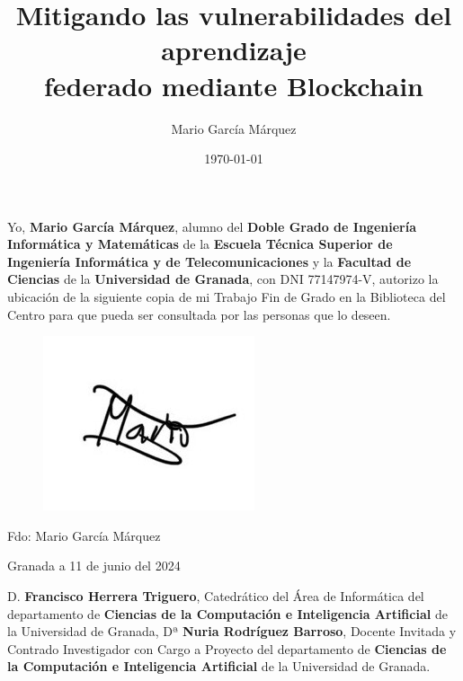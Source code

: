 \documentclass[oneside,openright,titlepage,numbers=noenddot,openany,headinclude,footinclude=true,
cleardoublepage=empty,abstractoff,BCOR=5mm,paper=a4,fontsize=12pt,main=spanish]{scrreprt}
\author{Mario García Márquez}
\date{\today}
\title{Mitigando las vulnerabilidades del aprendizaje\\federado mediante Blockchain}
\begin{document}
\maketitle



\tableofcontents

\thispagestyle{empty}

\newpage


Yo, \textbf{Mario García Márquez}, alumno del \textbf{Doble Grado de Ingeniería Informática y Matemáticas} de la \textbf{Escuela Técnica Superior de Ingeniería Informática y de Telecomunicaciones} y la \textbf{Facultad de Ciencias} de la \textbf{Universidad de Granada}, con DNI 77147974-V, autorizo la ubicación de la siguiente copia de mi Trabajo Fin de Grado en la Biblioteca del Centro para que pueda ser consultada por las personas que lo deseen.



\vspace{25em}

\begin{figure}[H]
\vspace{4em}
    \includegraphics[scale = 0.6]{firma_mario.jpg}
\end{figure}

Fdo: Mario García Márquez

\begin{flushright}
 Granada a 11 de junio \hspace{0.1em} del 2024
\end{flushright}





\thispagestyle{empty}

D. \textbf{Francisco Herrera Triguero}, Catedrático del Área de Informática del departamento de \textbf{Ciencias de la Computación e Inteligencia Artificial} de la Universidad de Granada, Dª \textbf{Nuria Rodríguez Barroso}, Docente Invitada y Contrado Investigador con Cargo a Proyecto del departamento de \textbf{Ciencias de la Computación e Inteligencia Artificial} de la Universidad de Granada.
\end{document}
